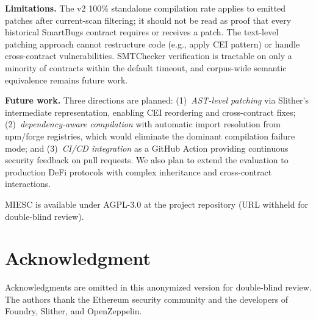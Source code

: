 \documentclass[conference]{IEEEtran}
\begin{document}
\textbf{Limitations.} The v2 100\% standalone compilation rate applies to emitted patches after current-scan filtering; it should not be read as proof that every historical SmartBugs contract requires or receives a patch. The text-level patching approach cannot restructure code (e.g., apply CEI pattern) or handle cross-contract vulnerabilities. SMTChecker verification is tractable on only a minority of contracts within the default timeout, and corpus-wide semantic equivalence remains future work.

\textbf{Future work.} Three directions are planned: (1)~\emph{AST-level patching} via Slither's intermediate representation, enabling CEI reordering and cross-contract fixes; (2)~\emph{dependency-aware compilation} with automatic import resolution from npm/forge registries, which would eliminate the dominant compilation failure mode; and (3)~\emph{CI/CD integration} as a GitHub Action providing continuous security feedback on pull requests. We also plan to extend the evaluation to production DeFi protocols with complex inheritance and cross-contract interactions.

MIESC is available under AGPL-3.0 at the project repository (URL withheld for double-blind review).

\section*{Acknowledgment}

Acknowledgments are omitted in this anonymized version for double-blind review. The authors thank the Ethereum security community and the developers of Foundry, Slither, and OpenZeppelin.



\end{document}

